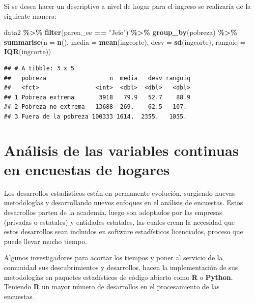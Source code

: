 \documentclass[
  12pt,
]{book}
\newenvironment{Shaded}{\begin{snugshade}}{\end{snugshade}}
\newcommand{\AttributeTok}[1]{\textcolor[rgb]{0.13,0.29,0.53}{#1}}
\newcommand{\FunctionTok}[1]{\textcolor[rgb]{0.13,0.29,0.53}{\textbf{#1}}}
\newcommand{\NormalTok}[1]{#1}
\newcommand{\SpecialCharTok}[1]{\textcolor[rgb]{0.81,0.36,0.00}{\textbf{#1}}}
\newcommand{\StringTok}[1]{\textcolor[rgb]{0.31,0.60,0.02}{#1}}
\begin{document}
Si se desea hacer un descriptivo a nivel de hogar para el ingreso se realizaría de la siguiente manera:

\begin{Shaded}
\begin{Highlighting}[]
\NormalTok{data2 }\SpecialCharTok{\%\textgreater{}\%} \FunctionTok{filter}\NormalTok{(paren\_ee }\SpecialCharTok{==} \StringTok{"Jefe"}\NormalTok{) }\SpecialCharTok{\%\textgreater{}\%} 
  \FunctionTok{group\_by}\NormalTok{(pobreza) }\SpecialCharTok{\%\textgreater{}\%}
  \FunctionTok{summarise}\NormalTok{(}\AttributeTok{n =} \FunctionTok{n}\NormalTok{(),}
            \AttributeTok{media =} \FunctionTok{mean}\NormalTok{(ingcorte),}
            \AttributeTok{desv =} \FunctionTok{sd}\NormalTok{(ingcorte),}
            \AttributeTok{rangoiq =} \FunctionTok{IQR}\NormalTok{(ingcorte))}
\end{Highlighting}
\end{Shaded}

\begin{verbatim}
## # A tibble: 3 x 5
##   pobreza                  n  media   desv rangoiq
##   <fct>                <int>  <dbl>  <dbl>   <dbl>
## 1 Pobreza extrema       3918   79.9   52.7    88.9
## 2 Pobreza no extrema   13688  269.    62.5   107. 
## 3 Fuera de la pobreza 100333 1614.  2355.   1055.
\end{verbatim}

\chapter{Análisis de las variables continuas en encuestas de hogares}\label{anuxe1lisis-de-las-variables-continuas-en-encuestas-de-hogares}

Los desarrollos estadísticos están en permanente evolución, surgiendo nuevas metodologías y desarrollando nuevos enfoques en el análisis de encuestas. Estos desarrollos parten de la academia, luego son adoptados por las empresas (privadas o estatales) y entidades estatales, las cuales crean la necesidad que estos desarrollos sean incluidos en software estadísticos licenciados, proceso que puede llevar mucho tiempo.

Algunos investigadores para acortar los tiempos y poner al servicio de la comunidad sus descubrimientos y desarrollos, hacen la implementación de sus metodologías en paquetes estadísticos de código abierto como \textbf{R} o \textbf{Python}. Teniendo \textbf{R} un mayor número de desarrollos en el procesamiento de las encuestas.
\end{document}
